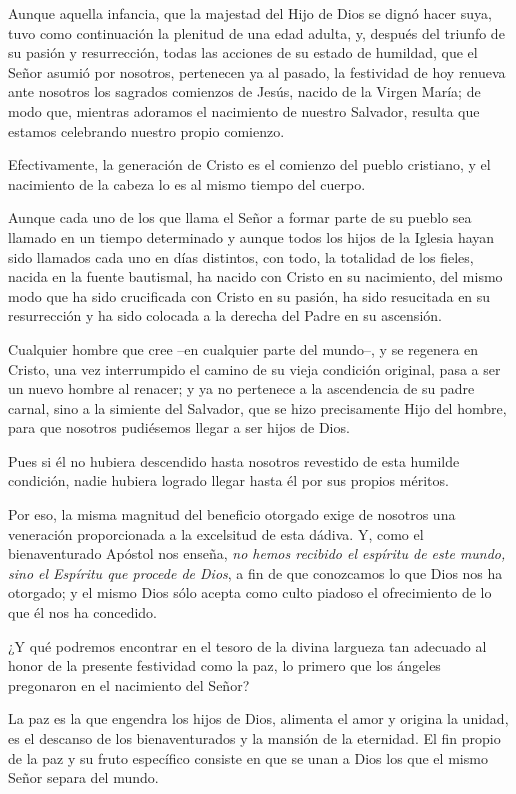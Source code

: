 \documentclass[]{article}
\begin{document}
Aunque aquella infancia, que la majestad del Hijo de Dios se dignó hacer
suya, tuvo como continuación la plenitud de una edad adulta, y, después
del triunfo de su pasión y resurrección, todas las acciones de su estado
de humildad, que el Señor asumió por nosotros, pertenecen ya al pasado,
la festividad de hoy renueva ante nosotros los sagrados comienzos de
Jesús, nacido de la Virgen María; de modo que, mientras adoramos el
nacimiento de nuestro Salvador, resulta que estamos celebrando nuestro
propio comienzo.

Efectivamente, la generación de Cristo es el comienzo del pueblo
cristiano, y el nacimiento de la cabeza lo es al mismo tiempo del
cuerpo.

Aunque cada uno de los que llama el Señor a formar parte de su pueblo
sea llamado en un tiempo determinado y aunque todos los hijos de la
Iglesia hayan sido llamados cada uno en días distintos, con todo, la
totalidad de los fieles, nacida en la fuente bautismal, ha nacido con
Cristo en su nacimiento, del mismo modo que ha sido crucificada con
Cristo en su pasión, ha sido resucitada en su resurrección y ha sido
colocada a la derecha del Padre en su ascensión.

Cualquier hombre que cree --en cualquier parte del mundo--, y se
regenera en Cristo, una vez interrumpido el camino de su vieja condición
original, pasa a ser un nuevo hombre al renacer; y ya no pertenece a la
ascendencia de su padre carnal, sino a la simiente del Salvador, que se
hizo precisamente Hijo del hombre, para que nosotros pudiésemos llegar a
ser hijos de Dios.

Pues si él no hubiera descendido hasta nosotros revestido de esta
humilde condición, nadie hubiera logrado llegar hasta él por sus propios
méritos.

Por eso, la misma magnitud del beneficio otorgado exige de nosotros una
veneración proporcionada a la excelsitud de esta dádiva. Y, como el
bienaventurado Apóstol nos enseña, \emph{no hemos recibido el espíritu
de este mundo, sino el Espíritu que procede de Dios}, a fin de que
conozcamos lo que Dios nos ha otorgado; y el mismo Dios sólo acepta como
culto piadoso el ofrecimiento de lo que él nos ha concedido.

¿Y qué podremos encontrar en el tesoro de la divina largueza tan
adecuado al honor de la presente festividad como la paz, lo primero que
los ángeles pregonaron en el nacimiento del Señor?

La paz es la que engendra los hijos de Dios, alimenta el amor y origina
la unidad, es el descanso de los bienaventurados y la mansión de la
eternidad. El fin propio de la paz y su fruto específico consiste en que
se unan a Dios los que el mismo Señor separa del mundo.
\end{document}
